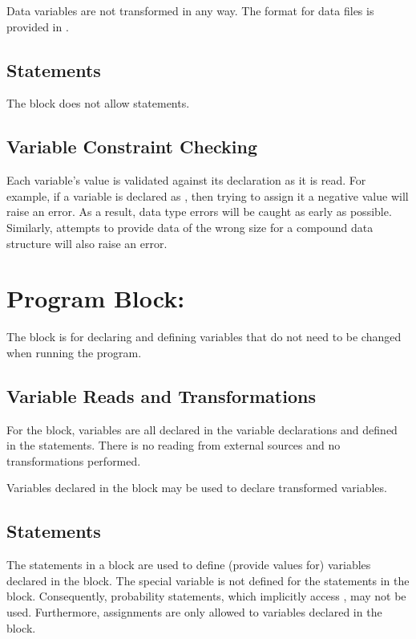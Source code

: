 Data variables are not transformed in any way.  The format for data
files is provided in .

\subsection{Statements}

The  block does not allow statements.

\subsection{Variable Constraint Checking}

Each variable's value is validated against its declaration as it is
read.  For example, if a variable  is declared as
, then trying to assign it a negative value will raise
an error.  As a result, data type errors will be caught as early as
possible.  Similarly, attempts to provide data of the wrong size for a
compound data structure will also raise an error.


\section{Program Block: }

The  block is for declaring and defining
variables that do not need to be changed when running the program.  

\subsection{Variable Reads and Transformations}

For the  block, variables are all declared in
the variable declarations and defined in the statements.  There is no
reading from external sources and no transformations performed.

Variables declared in the  block may be used to declare
transformed variables.

\subsection{Statements}

The statements in a  block are used to define
(provide values for) variables declared in the 
block.  The special variable  is not defined for the
statements in the  block.  Consequently,
probability statements, which implicitly access , may not
be used.  Furthermore, assignments are only allowed to variables
declared in the  block.

